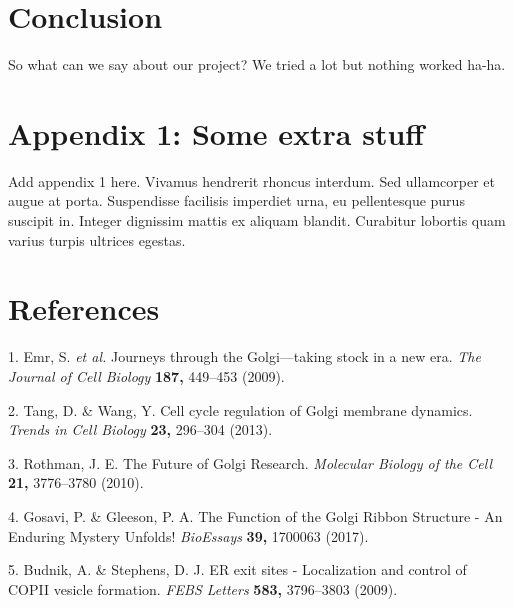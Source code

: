 \documentclass[12pt,a4paper,]{Dissertate}
\begin{document}
\hypertarget{conclusion-3}{%
\chapter{Conclusion}\label{conclusion-3}}

So what can we say about our project? We tried a lot but nothing worked
ha-ha.

\hypertarget{appendix-1-some-extra-stuff}{%
\chapter*{Appendix 1: Some extra
stuff}\label{appendix-1-some-extra-stuff}}

Add appendix 1 here. Vivamus hendrerit rhoncus interdum. Sed ullamcorper
et augue at porta. Suspendisse facilisis imperdiet urna, eu pellentesque
purus suscipit in. Integer dignissim mattis ex aliquam blandit.
Curabitur lobortis quam varius turpis ultrices egestas.

\footnotesize

\hypertarget{references}{%
\chapter*{References}\label{references}}

\hypertarget{refs}{}
\leavevmode\hypertarget{ref-emr_journeys_2009}{}%
1. Emr, S. \emph{et al.} Journeys through the Golgi---taking stock in a
new era. \emph{The Journal of Cell Biology} \textbf{187,} 449--453
(2009).

\leavevmode\hypertarget{ref-tang_cell_2013}{}%
2. Tang, D. \& Wang, Y. Cell cycle regulation of Golgi membrane
dynamics. \emph{Trends in Cell Biology} \textbf{23,} 296--304 (2013).

\leavevmode\hypertarget{ref-rothman_future_2010}{}%
3. Rothman, J. E. The Future of Golgi Research. \emph{Molecular Biology
of the Cell} \textbf{21,} 3776--3780 (2010).

\leavevmode\hypertarget{ref-gosavi_function_2017}{}%
4. Gosavi, P. \& Gleeson, P. A. The Function of the Golgi Ribbon
Structure - An Enduring Mystery Unfolds! \emph{BioEssays} \textbf{39,}
1700063 (2017).

\leavevmode\hypertarget{ref-budnik_er_2009}{}%
5. Budnik, A. \& Stephens, D. J. ER exit sites - Localization and
control of COPII vesicle formation. \emph{FEBS Letters} \textbf{583,}
3796--3803 (2009).
\end{document}
